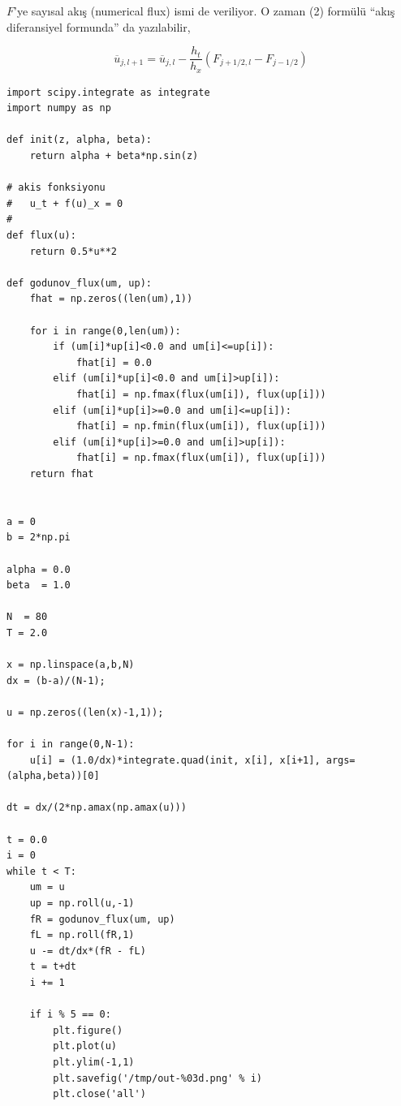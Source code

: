 \documentclass[12pt,fleqn]{article}\usepackage{../../common}
\begin{document}
$F$'ye sayısal akış (numerical flux) ismi de veriliyor. O zaman (2) formülü
``akış diferansiyel formunda'' da yazılabilir,

$$
\overline{u}_{j,l+1} = \overline{u}_{j,l} -
\frac{h_t}{h_x} ( F_{j+1/2,l} - F_{j-1/2} )
$$

\begin{verbatim}
import scipy.integrate as integrate
import numpy as np

def init(z, alpha, beta):
    return alpha + beta*np.sin(z)

# akis fonksiyonu 
#	u_t + f(u)_x = 0
#
def flux(u):
    return 0.5*u**2

def godunov_flux(um, up):
    fhat = np.zeros((len(um),1))

    for i in range(0,len(um)):
        if (um[i]*up[i]<0.0 and um[i]<=up[i]):
            fhat[i] = 0.0
        elif (um[i]*up[i]<0.0 and um[i]>up[i]):
            fhat[i] = np.fmax(flux(um[i]), flux(up[i]))
        elif (um[i]*up[i]>=0.0 and um[i]<=up[i]):
            fhat[i] = np.fmin(flux(um[i]), flux(up[i]))
        elif (um[i]*up[i]>=0.0 and um[i]>up[i]):
            fhat[i] = np.fmax(flux(um[i]), flux(up[i]))
    return fhat


a = 0
b = 2*np.pi

alpha = 0.0
beta  = 1.0

N  = 80
T = 2.0

x = np.linspace(a,b,N)     
dx = (b-a)/(N-1);  

u = np.zeros((len(x)-1,1)); 

for i in range(0,N-1):
    u[i] = (1.0/dx)*integrate.quad(init, x[i], x[i+1], args=(alpha,beta))[0]

dt = dx/(2*np.amax(np.amax(u)))

t = 0.0
i = 0
while t < T:
    um = u
    up = np.roll(u,-1)
    fR = godunov_flux(um, up) 
    fL = np.roll(fR,1)
    u -= dt/dx*(fR - fL)
    t = t+dt
    i += 1

    if i % 5 == 0:
        plt.figure()
        plt.plot(u)
        plt.ylim(-1,1)
        plt.savefig('/tmp/out-%03d.png' % i)
        plt.close('all')
\end{verbatim}
\end{document}
